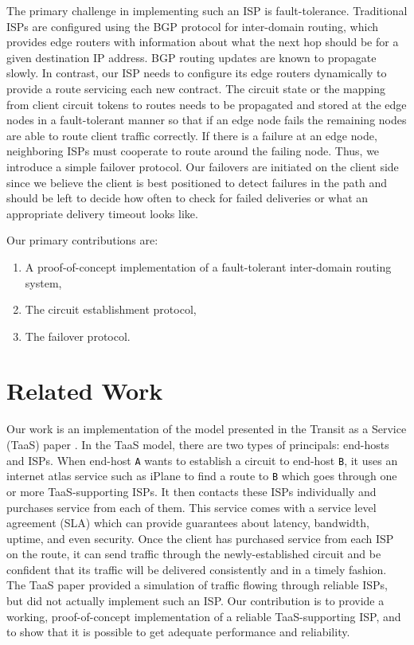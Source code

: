 \documentclass{article}
\begin{document}
The primary challenge in implementing such an ISP is
fault-tolerance. Traditional ISPs are configured using the BGP
protocol for inter-domain routing, which provides edge routers with information about what the
next hop should be for a given destination IP address. BGP routing updates are known to
propagate slowly. In contrast, our ISP needs to
configure its edge routers dynamically to provide a route servicing
each new contract. The circuit state or the mapping from client circuit tokens to
routes needs to be propagated and stored at the edge nodes in a
fault-tolerant manner so that if an edge node fails the remaining
nodes are able to route client traffic correctly. If there is a
failure at an edge node, neighboring ISPs must cooperate to route
around the failing node. Thus, we introduce a simple failover
protocol. Our failovers are initiated on the client side since we believe the
client is best positioned to detect failures in the path and should be left to
decide how often to check for failed deliveries or what
an appropriate delivery timeout looks like.

Our primary contributions are:
\begin{enumerate}
\item A proof-of-concept implementation of a fault-tolerant
  inter-domain routing system,
\item The circuit establishment protocol,
\item The failover protocol.
\end{enumerate}

\section{Related Work}
Our work is an implementation of the model presented in the Transit as
a Service (TaaS) paper \cite{taas}. In the TaaS model, there are two
types of principals: end-hosts and ISPs. When end-host \texttt{A}
wants to establish a circuit to end-host \texttt{B}, it uses an internet
atlas service such as iPlane \cite{iplane} to find a route to
\texttt{B} which goes through one or more TaaS-supporting ISPs. It
then contacts these ISPs individually and purchases service from each
of them. This service comes with a service level agreement (SLA) which can
provide guarantees about latency, bandwidth, uptime, and even
security. Once the client has purchased service from each ISP on the
route, it can send traffic through the newly-established circuit and
be confident that its traffic will be delivered consistently and in a
timely fashion. The TaaS paper provided a simulation of traffic
flowing through reliable ISPs, but did not actually implement such an
ISP. Our contribution is to provide a working, proof-of-concept
implementation of a reliable TaaS-supporting ISP, and to show that it
is possible to get adequate performance and reliability.
\end{document}
